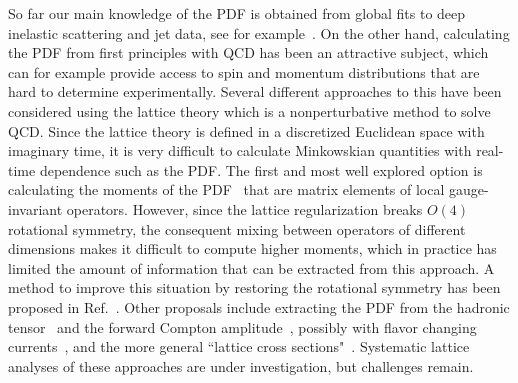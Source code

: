 \documentclass[prd,aps,twocolumn,preprintnumbers,showpacs,nofootinbib,superscriptaddress,notitlepage]{revtex4-1}
\begin{document}
So far our main knowledge of the PDF is obtained from global fits to deep inelastic scattering and jet data, see for example~\cite{Ball:2014uwa,Dulat:2015mca,Martin:2009iq,Alekhin:2017kpj,Buckley:2014ana}. On the other hand, calculating the PDF from first principles with QCD has been an attractive subject, which can for example provide access to spin and momentum distributions that are hard to determine experimentally. Several different approaches to this have been considered using the lattice theory which is a nonperturbative method to solve QCD. Since the lattice theory is defined in a discretized Euclidean space with imaginary time, it is very difficult to calculate Minkowskian quantities with real-time dependence such as the PDF. The first and most well explored option is calculating the moments of the PDF~\cite{Martinelli:1987zd,Martinelli:1988xs,Detmold:2001dv,Detmold:2002nf,Dolgov:2002zm} that are matrix elements of local gauge-invariant operators. However, since the lattice regularization breaks $O(4)$ rotational symmetry, the consequent mixing between operators of different dimensions makes it difficult to compute higher moments, which in practice has limited the amount of information that can be extracted from this approach. A method to improve this situation by restoring the rotational symmetry has been proposed in Ref.~\cite{Davoudi:2012ya}.
Other proposals include extracting the PDF from the hadronic tensor~\cite{Liu:1993cv,Liu:1998um,Liu:1999ak,Liu:2016djw} and the forward Compton amplitude~\cite{Chambers:2017dov}, possibly with flavor changing currents~\cite{Detmold:2005gg}, and the more general ``lattice cross sections"~\cite{Ma:2014jla,Ma:2017pxb}. Systematic lattice analyses of these approaches are  under investigation, but challenges remain.
\end{document}
